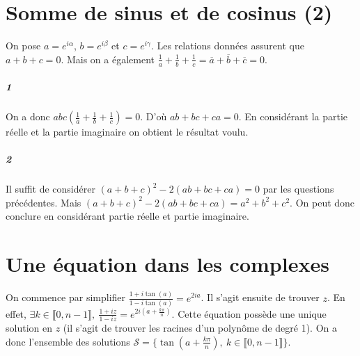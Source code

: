 \documentclass[10pt,a4paper]{article}
\begin{document}
\section{Somme de sinus et de cosinus (2)}

On pose $a = e^{i \alpha}$, $b = e^{i \beta}$ et $c = e^{i \gamma}$. Les relations données assurent que $a+b+c = 0$. Mais on a également $\frac{1}{a}+ \frac{1}{b}+ \frac{1}{c} = \overline{a}+\overline{b}+\overline{c}=0$. 

\subparagraph{1}On a donc $abc \left(\frac{1}{a}+ \frac{1}{b}+ \frac{1}{c}\right)=0$. D'où $ab +bc +ca=0$. En considérant la partie réelle et la partie imaginaire on obtient le résultat voulu. 

\subparagraph{2}Il suffit de considérer $(a+b+c)^2 - 2(ab+bc+ca) = 0$ par les questions précédentes. Mais $(a+b+c)^2 - 2(ab+bc+ca) = a^2+b^2+c^2$. On peut donc conclure en considérant partie réelle et partie imaginaire.

\section{Une équation dans les complexes}
On commence par simplifier $\frac{1+i\tan(a)}{1-i\tan(a)} = e^{2ia}$. Il s'agit ensuite de trouver $z$. En effet, $\exists k \in \llbracket 0,n-1 \rrbracket, \ \frac{1+iz}{1-iz} = e^{2i (a+\frac{k\pi}{n})}$. Cette équation possède une unique solution en $z$ (il s'agit de trouver les racines d'un polynôme de degré 1). On a donc l'ensemble des solutions $\mathcal{S} = \lbrace \tan\left( a + \frac{k\pi}{n}\right), \ k \in \llbracket 0,n-1 \rrbracket\rbrace$.
\end{document}

